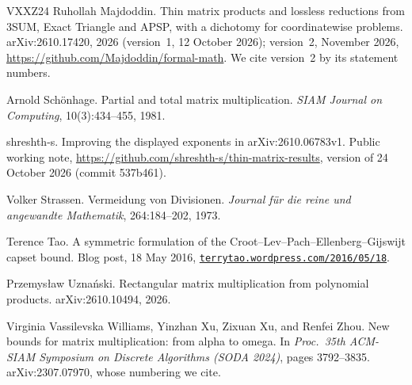 \documentclass[11pt]{article}
\theoremstyle{definition}
\theoremstyle{remark}
\begin{document}
\begin{thebibliography}{VXXZ24}
 Ruhollah Majdoddin. Thin matrix products and lossless reductions from 3SUM, Exact Triangle and APSP, with a dichotomy for coordinatewise problems. arXiv:2610.17420, 2026 (version~1, 12 October 2026); version~2, November 2026, \url{https://github.com/Majdoddin/formal-math}. We cite version~2 by its statement numbers.%

 Arnold Sch\"onhage. Partial and total matrix multiplication. \emph{SIAM Journal on Computing}, 10(3):434--455, 1981.

 shreshth-s. Improving the displayed exponents in arXiv:2610.06783v1. Public working note, \url{https://github.com/shreshth-s/thin-matrix-results}, version of 24 October 2026 (commit 537b461).

 Volker Strassen. Vermeidung von Divisionen. \emph{Journal f\"ur die reine und angewandte Mathematik}, 264:184--202, 1973.

 Terence Tao. A symmetric formulation of the Croot--Lev--Pach--Ellenberg--Gijswijt capset bound. Blog post, 18 May 2016, \href{https://terrytao.wordpress.com/2016/05/18/a-symmetric-formulation-of-the-croot-lev-pach-ellenberg-gijswijt-capset-bound/}{\nolinkurl{terrytao.wordpress.com/2016/05/18}}.

 Przemys\l{}aw Uzna\'nski. Rectangular matrix multiplication from polynomial products. arXiv:2610.10494, 2026.

 Virginia Vassilevska Williams, Yinzhan Xu, Zixuan Xu, and Renfei Zhou. New bounds for matrix multiplication: from alpha to omega. In \emph{Proc.\ 35th ACM-SIAM Symposium on Discrete Algorithms (SODA 2024)}, pages 3792--3835. arXiv:2307.07970, whose numbering we cite.

\end{thebibliography}
\end{document}
